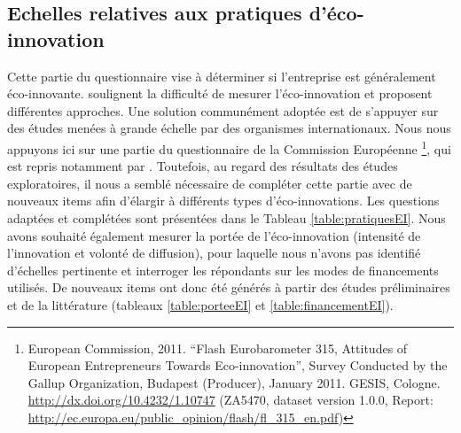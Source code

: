 \subsection{Echelles relatives aux pratiques d’éco-innovation }

Cette partie du questionnaire vise à déterminer si l’entreprise est généralement éco-innovante. \textcite{arundel2009measuring} soulignent la difficulté de mesurer l’éco-innovation et proposent différentes approches. Une solution communément adoptée est de s’appuyer sur des études menées à grande échelle par des organismes internationaux. Nous nous appuyons ici sur une partie du questionnaire  de la Commission Européenne \footnote{European Commission, 2011. “Flash Eurobarometer 315, Attitudes of European Entrepreneurs Towards Eco-innovation”, Survey Conducted by the Gallup Organization, Budapest (Producer), January 2011. GESIS, Cologne. \url{http://dx.doi.org/10.4232/1.10747} (ZA5470, dataset version 1.0.0, Report: \url{http://ec.europa.eu/public_opinion/flash/fl_315_en.pdf})}, qui est repris notamment par \textcite{triguero2013drivers}. Toutefois, au regard des résultats des études exploratoires, il nous a semblé nécessaire de compléter cette partie avec de nouveaux items afin d’élargir à différents types d’éco-innovations. Les questions adaptées et complétées sont présentées dans le Tableau \ref{table:pratiquesEI}. Nous avons souhaité également mesurer la portée de l’éco-innovation (intensité de l’innovation et volonté de diffusion), pour laquelle nous n’avons pas identifié d’échelles pertinente et interroger les répondants sur les modes de financements utilisés. De nouveaux items ont donc été générés à partir des études préliminaires et de la littérature (tableaux \ref{table:porteeEI} et  \ref{table:financementEI}). 

